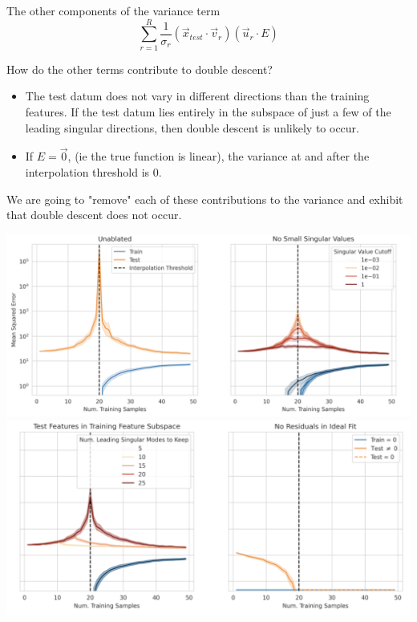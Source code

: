 \documentclass{beamer}
\begin{document}
\begin{frame}{The other components of the variance term}
    \begin{equation*}
        \sum_{r=1}^R \frac{1}{\sigma_r}(\vec{x}_{test} \cdot \vec{v}_r)(\vec{u}_r \cdot E)
    \end{equation*}

    How do the other terms contribute to double descent?

    \begin{itemize}
        \item The test datum does not vary in different directions than the training features. If the test datum lies entirely in the subspace of just a few of the leading singular directions, then double descent is unlikely to occur.
        \item If $E = \vec{0}$, (ie the true function is linear), the variance at and after the interpolation threshold is $0$. 
    \end{itemize}

    \hspace{5cm}
    \pause

    We are going to "remove" each of these contributions to the variance and exhibit that double descent does not occur. 
\end{frame}


\begin{frame}{}
    \begin{center}
        \includegraphics[scale=0.31]{ablate1.png}
        \includegraphics[scale=0.31]{ablate2.png}
    \end{center}
\end{frame}
\end{document}
